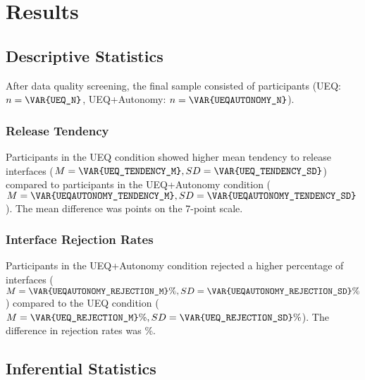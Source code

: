 
\section{Results}

\subsection{Descriptive Statistics}
After data quality screening, the final sample consisted of \texttt{} participants (UEQ: $n = \texttt{\VAR{UEQ\_N}}$, UEQ+Autonomy: $n = \texttt{\VAR{UEQAUTONOMY\_N}}$). 

\subsubsection{Release Tendency}
Participants in the UEQ condition showed higher mean tendency to release interfaces ($M = \texttt{\VAR{UEQ\_TENDENCY\_M}}, SD = \texttt{\VAR{UEQ\_TENDENCY\_SD}}$) compared to participants in the UEQ+Autonomy condition ($M = \texttt{\VAR{UEQAUTONOMY\_TENDENCY\_M}}, SD = \texttt{\VAR{UEQAUTONOMY\_TENDENCY\_SD}}$). The mean difference was \texttt{} points on the 7-point scale.

\subsubsection{Interface Rejection Rates}
Participants in the UEQ+Autonomy condition rejected a higher percentage of interfaces ($M = \texttt{\VAR{UEQAUTONOMY\_REJECTION\_M}}\%, SD = \texttt{\VAR{UEQAUTONOMY\_REJECTION\_SD}}\%$) compared to the UEQ condition ($M = \texttt{\VAR{UEQ\_REJECTION\_M}}\%, SD = \texttt{\VAR{UEQ\_REJECTION\_SD}}\%$). The difference in rejection rates was \texttt{}\%.

\subsection{Inferential Statistics}

